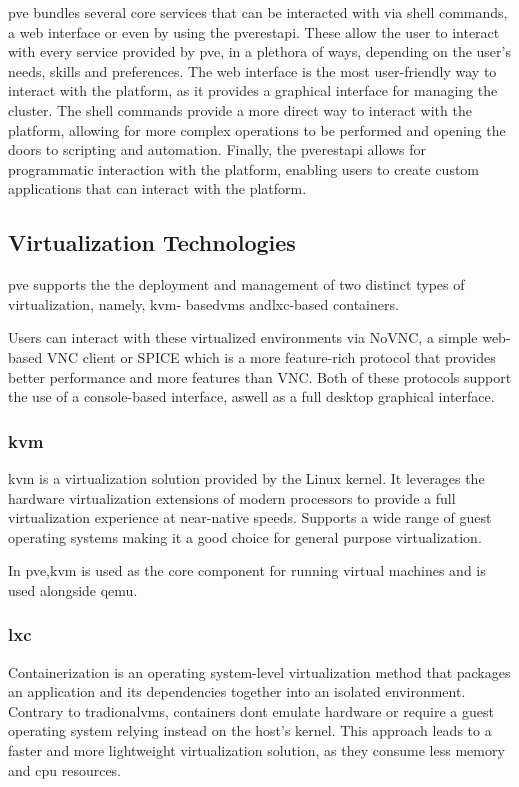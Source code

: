 \ac{pve} bundles several core services that can be interacted with via shell commands, a web interface or even by using
the \ac{pve}\ac{rest}\ac{api}.
These allow the user to interact with every service provided by \ac{pve}, in a plethora of ways, depending on the user's
needs, skills and preferences. The web interface is the most user-friendly way to interact with the platform, as it
provides a graphical interface for managing the cluster. The shell commands provide a more direct way to interact with the
platform, allowing for more complex operations to be performed and opening the doors to scripting and automation. Finally,
the \ac{pve}\ac{rest}\ac{api} allows for programmatic interaction with the platform, enabling users to create custom
applications that can interact with the platform.


\subsection{Virtualization Technologies}
\ac{pve} supports the the deployment and management of two distinct types of virtualization, namely, \ac{kvm}- 
based\ac{vm}s and\ac{lxc}-based containers.

Users can interact with these virtualized environments via NoVNC, a simple web-based VNC client or SPICE which is a more
feature-rich protocol that provides better performance and more features than VNC.
Both of these protocols support the use of a console-based interface, aswell as a full desktop graphical interface.


\subsubsection{\ac{kvm}}
\ac{kvm} is a virtualization solution provided by the Linux kernel. It leverages the hardware virtualization extensions 
of modern processors to provide a full virtualization experience at near-native speeds. Supports a wide range of guest 
operating systems making it a good choice for general purpose virtualization.

In \ac{pve},\ac{kvm} is used as the core component for running virtual machines and is used alongside \ac{qemu}.

\subsubsection{\ac{lxc}}
Containerization is an operating system-level virtualization method that packages an application and its dependencies
together into an isolated environment. Contrary to tradional\ac{vm}s, containers dont emulate hardware or require a 
guest operating system relying instead on the host's kernel. This approach leads to a faster and more lightweight 
virtualization solution, as they consume less memory and cpu resources.

